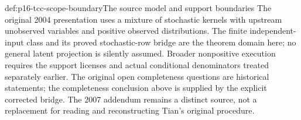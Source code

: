 \begin{proofboundary}{def:p16-tcc-scope-boundary}{The source model and support boundaries}
The original 2004 presentation uses a mixture of stochastic kernels
with upstream unobserved variables and positive observed distributions.
The finite independent-input class and its proved stochastic-row bridge
are the theorem domain here; no general latent projection is silently
assumed. Broader nonpositive execution requires the support licenses
and actual conditional denominators treated separately earlier.
The original open completeness questions are historical statements;
the completeness conclusion above is supplied by the explicit corrected
bridge. The 2007 addendum remains a distinct source, not a replacement
for reading and reconstructing Tian's original procedure.
\end{proofboundary}
